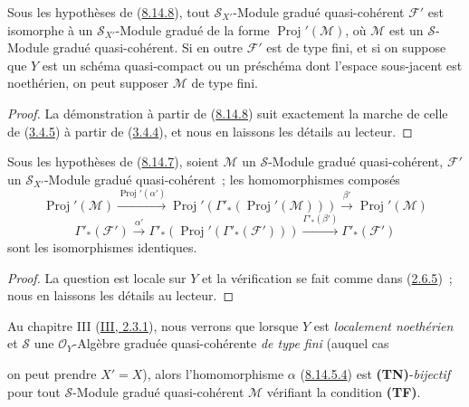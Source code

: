 \begin{corollary}[8.14.9]
\label{II.8.14.9-fr}
Sous les hypothèses de (\hyperref[II.8.14.8-fr]{8.14.8}), tout
$\mathcal{S}_{X'}$-Module gradué quasi-cohérent $\mathcal{F}'$ est isomorphe
à un $\mathcal{S}_{X'}$-Module gradué de la forme
$\operatorname{Proj}'(\mathcal{M})$, où $\mathcal{M}$ est un
$\mathcal{S}$-Module gradué quasi-cohérent. Si en outre $\mathcal{F}'$ est de
type fini, et si on suppose que $Y$ est un schéma quasi-compact ou un
préschéma dont l'espace sous-jacent est noethérien, on peut supposer
$\mathcal{M}$ de type fini.
\end{corollary}

\begin{proof}
La démonstration à partir de (\hyperref[II.8.14.8-fr]{8.14.8}) suit
exactement la marche de celle de (\hyperref[II.3.4.5-fr]{3.4.5}) à partir de
(\hyperref[II.3.4.4-fr]{3.4.4}), et nous en laissons les détails au lecteur.
\end{proof}

\begin{proposition}[8.14.10]
\label{II.8.14.10-fr}
Sous les hypothèses de (\hyperref[II.8.14.7-fr]{8.14.7}), soient
$\mathcal{M}$ un $\mathcal{S}$-Module gradué quasi-cohérent,
$\mathcal{F}'$ un $\mathcal{S}_{X'}$-Module gradué quasi-cohérent~; les
homomorphismes composés
\begin{equation}
\label{II.8.14.10.1-fr}
  \operatorname{Proj}'(\mathcal{M})
  \xrightarrow{\operatorname{Proj}'(\alpha')}
  \operatorname{Proj}'(\Gamma'_*(\operatorname{Proj}'(\mathcal{M})))
  \xrightarrow{\beta'}\operatorname{Proj}'(\mathcal{M})
\tag{8.14.10.1}
\end{equation}
\begin{equation}
\label{II.8.14.10.2-fr}
  \Gamma'_*(\mathcal{F}')
  \xrightarrow{\alpha'}
  \Gamma'_*(\operatorname{Proj}'(\Gamma'_*(\mathcal{F}')))
  \xrightarrow{\Gamma'_*(\beta')}\Gamma'_*(\mathcal{F}')
\tag{8.14.10.2}
\end{equation}
sont les isomorphismes identiques.
\end{proposition}

\begin{proof}
La question est locale sur $Y$ et la vérification se fait comme dans
(\hyperref[II.2.6.5-fr]{2.6.5})~; nous en laissons les détails au lecteur.
\end{proof}

\begin{remark}[8.14.11]
\label{II.8.14.11-fr}
Au chapitre III (\hyperref[III.2.3.1-fr]{III, 2.3.1}), nous verrons que
lorsque $Y$ est \emph{localement noethérien} et $\mathcal{S}$ une
$\mathcal{O}_Y$-Algèbre graduée quasi-cohérente \emph{de type fini} (auquel
cas

on peut prendre $X'=X$), alors l'homomorphisme $\alpha$
(\hyperref[II.8.14.5.4-fr]{8.14.5.4}) est \textbf{(TN)}-\emph{bijectif} pour
tout $\mathcal{S}$-Module gradué quasi-cohérent $\mathcal{M}$ vérifiant la
condition \textbf{(TF)}.
\end{remark}

